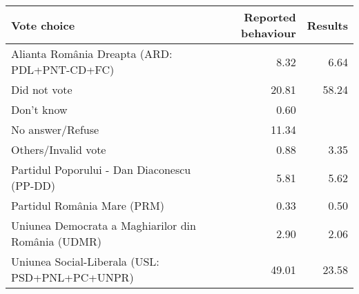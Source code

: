 
\begin{tabular}{l|r|r}
\hline
Vote choice & Reported behaviour & Results\\
\hline
Alianta România Dreapta (ARD: PDL+PNT-CD+FC) & 8.32 & 6.64\\
\hline
Did not vote & 20.81 & 58.24\\
\hline
Don't know & 0.60 & \\
\hline
No answer/Refuse & 11.34 & \\
\hline
Others/Invalid vote & 0.88 & 3.35\\
\hline
Partidul Poporului - Dan Diaconescu (PP-DD) & 5.81 & 5.62\\
\hline
Partidul România Mare (PRM) & 0.33 & 0.50\\
\hline
Uniunea Democrata a Maghiarilor din România (UDMR) & 2.90 & 2.06\\
\hline
Uniunea Social-Liberala (USL: PSD+PNL+PC+UNPR) & 49.01 & 23.58\\
\hline
\end{tabular}
